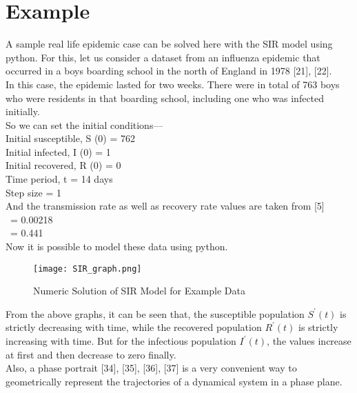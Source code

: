 \pagebreak
\section{Example}

A sample real life epidemic case can be solved here with the SIR model using python. For this, let us consider a dataset from an influenza epidemic that occurred in a boys boarding school in the north of England in 1978 [21], [22]. \\

In this case, the epidemic lasted for two weeks. There were in total of 763 boys who were residents in that boarding school, including one who was infected initially. \\

So we can set the initial conditions--- \\
\noindent Initial susceptible, S (0) = 762 \\
Initial infected, I (0) = 1 \\
Initial recovered, R (0) = 0 \\
Time period, t = 14 days \\
Step size = 1 \\

And the transmission rate as well as recovery rate values are taken from [5] \\
\textbeta \ = 0.00218 \\
\textalpha \ = 0.441 \\

Now it is possible to model these data using python. \\

\begin{figure}[H]
\centering
\texttt{[image: SIR\_graph.png]}
\caption{Numeric Solution of SIR Model for Example Data}
\label{fig:SIR Model Numeric Solution}
\end{figure}

From the above graphs, it can be seen that, the susceptible population $S^{\prime}(t)$ is strictly decreasing with time, while the recovered population $R^{\prime}(t)$ is strictly increasing with time. But for the infectious population $I^{\prime}(t)$, the values increase at first and then decrease to zero finally. \\

Also, a phase portrait [34], [35], [36], [37] is a very convenient way to geometrically represent the trajectories of a dynamical system in a phase plane. \\

